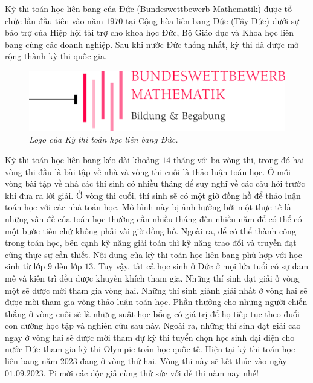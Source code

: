\begin{multicols}{2}
	Kỳ thi toán học liên bang của Đức (Bundeswettbewerb Mathematik) được tổ chức lần đầu tiên vào năm $1970$ tại Cộng hòa liên bang Đức (Tây Đức) dưới sự bảo trợ của Hiệp hội tài trợ cho khoa học Đức, Bộ Giáo dục và Khoa học liên bang cùng các doanh nghiệp. Sau khi nước Đức thống nhất, kỳ thi đã được mở rộng thành kỳ thi quốc gia. 
	\begin{figure}[H]
		\vspace*{-5pt}
		\centering
		\captionsetup{labelformat= empty, justification=centering}
		\includegraphics[width= 1\linewidth]{2}
		\caption{\small\textit{\color{cackithi}Logo của Kỳ thi toán học liên bang Đức.}}
		\vspace*{-10pt}
	\end{figure}
	Kỳ thi toán học liên bang kéo dài khoảng $14$ tháng với ba vòng thi, trong đó hai vòng thi đầu là bài tập về nhà và vòng thi cuối là thảo luận toán học. Ở mỗi vòng bài tập về nhà các thí sinh có nhiều tháng để suy nghĩ về các câu hỏi trước khi đưa ra lời giải. Ở vòng thi cuối, thí sinh sẽ có một giờ đồng hồ để thảo luận toán học với các nhà toán học. Mô hình này bị ảnh hưởng bởi một thực tế là những vấn đề của toán học thường cần nhiều tháng đến nhiều năm để có thể có một bước tiến chứ không phải vài giờ đồng hồ. Ngoài ra, để có thể thành công trong toán học, bên cạnh kỹ năng giải toán thì kỹ năng trao đổi và truyền đạt cũng thực sự cần thiết. 
	\vskip 0.1cm
	Nội dung của kỳ thi toán học liên bang phù hợp với học sinh từ lớp $9$ đến lớp $13$. Tuy vậy, tất cả học sinh ở Đức ở mọi lứa tuổi có sự đam mê và kiên trì đều được khuyến khích tham gia. Những thí sinh đạt giải ở vòng một sẽ được mời tham gia vòng hai. Những thí sinh giành giải nhất ở vòng hai sẽ được mời tham gia vòng thảo luận toán học. Phần thưởng cho những người chiến thắng ở vòng cuối sẽ là những suất học bổng có giá trị để họ tiếp tục theo đuổi con đường học tập và nghiên cứu sau này. Ngoài ra, những thí sinh đạt giải cao ngay ở vòng hai sẽ được mời tham dự kỳ thi tuyển chọn học sinh đại diện cho nước Đức tham gia kỳ thi Olympic toán học quốc tế.
	\vskip 0.1cm
	Hiện tại kỳ thi toán học liên bang năm $2023$ đang ở vòng thứ hai. Vòng thi này sẽ kết thúc vào ngày $01.09.2023$. Pi mời các độc giả cùng thử sức với đề thi năm nay nhé!

\end{multicols}
